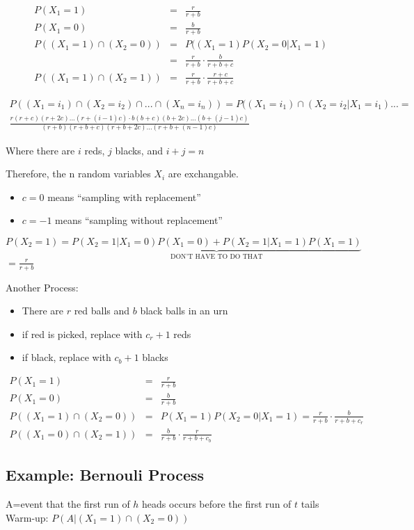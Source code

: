 \begin{eqnarray*}
P(X_1=1) &=& \frac{r}{r+b} \\
P(X_1=0) &=& \frac{b}{r+b} \\
P((X_1=1) \cap (X_2=0)) &=& P((X_1=1)P(X_2=0|X_1=1) \\
                        &=& \frac{r}{r+b} \cdot \frac{b}{r+b+c} \\
P((X_1=1) \cap (X_2=1)) &=& \frac{r}{r+b} \cdot \frac{r+c}{r+b+c}
\end{eqnarray*}

\begin{eqnarray*}
P((X_1=i_1) \cap (X_2=i_2) \cap...\cap (X_n=i_n)) = P((X_1=i_1) \cap (X_2=i_2|X_1=i_1)... = \\
\frac{r(r+c)(r+2c)...(r+ (i-1)c) \cdot b(b+c)(b+2c)...(b+(j-1)c)}{(r+b)(r+b+c)(r+b+2c)...(r+b+(n-1)c)}
\end{eqnarray*}

Where there are $i$ reds, $j$ blacks, and $i+j=n$

Therefore, the n random variables $X_i$ are exchangable.

\begin{itemize}
\item $c= 0$ means ``sampling with replacement''
\item $c=-1$ means ``sampling without replacement''
\end{itemize}

$P(X_2=1) = \underbrace {P(X_2=1|X_1=0)P(X_1=0)+P(X_2=1|X_1=1)P(X_1=1)}_{\mbox{DON'T HAVE TO DO THAT}}$
$ = \frac{r}{r+b} $

Another Process:
\begin{itemize}
\item[] There are $r$ red balls and $b$ black balls in an urn
\item if red is picked, replace with $c_r+1$ reds
\item if black, replace with $c_b+1$ blacks
\end{itemize}

\begin{eqnarray*} 
P(X_1=1) &=& \frac{r}{r+b} \\
P(X_1=0) &=& \frac{b}{r+b} \\
P((X_1=1) \cap (X_2=0)) &=& P(X_1=1)P(X_2=0|X_1=1) = \frac{r}{r+b} \cdot \frac{b}{r+b+c_r} \\
P((X_1=0) \cap (X_2=1)) &=& \frac{b}{r+b} \cdot \frac{r}{r+b+c_b} 
\end{eqnarray*}

\subsection{Example: Bernouli Process}
A=event that the first run of $h$ heads occurs before the first run of $t$ tails\\
Warm-up: $P(A|(X_1=1) \cap (X_2=0))$

